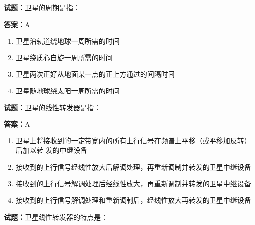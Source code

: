 \documentclass{ctexbook}
\begin{document}




\vspace{1em}

\textbf{试题：}卫星的周期是指： 

\textbf{答案：}A 

\begin{enumerate}[leftmargin=3em]
  \item 卫星沿轨道绕地球一周所需的时间 

  \item 卫星绕质心自旋一周所需的时间 

  \item 卫星两次正好从地面某一点的正上方通过的间隔时间 

  \item 卫星随地球绕太阳一周所需的时间 

\end{enumerate}





\vspace{1em}

\textbf{试题：}卫星的线性转发器是指： 

\textbf{答案：}A 


\begin{enumerate}[leftmargin=3em]
  \item 卫星上将接收到的一定带宽内的所有上行信号在频谱上平移（或平移加反转）后加以转
发的中继设备 

  \item 接收到的上行信号经线性放大后解调处理，再重新调制并转发的卫星中继设备 

  \item 接收到的上行信号解调处理后经线性放大，再重新调制并转发的卫星中继设备 

  \item 接收到的上行信号解调处理和重新调制后，经线性放大再转发的卫星中继设备 

\end{enumerate}





\vspace{1em}

\textbf{试题：}卫星线性转发器的特点是： 
\end{document}
